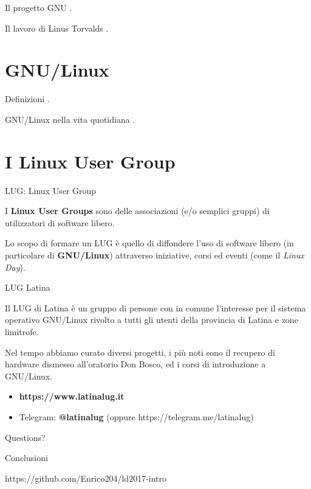 \documentclass[10pt]{beamer}
\begin{document}
\begin{frame}[fragile]{Il progetto GNU}
.
\end{frame}

\begin{frame}[fragile]{Il lavoro di Linus Torvalds}
.
\end{frame}

\section{GNU/Linux}

\begin{frame}[fragile]{Definizioni}
.
\end{frame}

\begin{frame}[fragile]{GNU/Linux nella vita quotidiana}
.
\end{frame}

\section{I Linux User Group}

\begin{frame}{LUG: Linux User Group}

I \textbf{Linux User Groups} sono delle associazioni (e/o semplici gruppi) di utilizzatori di software libero.

Lo scopo di formare un LUG è quello di diffondere l'uso di software libero (in particolare di \textbf{GNU/Linux}) attraverso iniziative, corsi ed eventi (come il \textit{Linux Day}).

\end{frame}

\begin{frame}[fragile]{LUG Latina}

Il LUG di Latina è un gruppo di persone con in comune l'interesse per il sistema operativo GNU/Linux rivolto a tutti gli utenti della provincia di Latina e zone limitrofe.

Nel tempo abbiamo curato diversi progetti, i più noti sono il recupero di hardware dismesso all'oratorio Don Bosco, ed i corsi di introduzione a GNU/Linux.

\begin{itemize}
\item \textbf{https://www.latinalug.it}
\item Telegram: \textbf{@latinalug} (oppure https://telegram.me/latinalug)
\end{itemize}

\end{frame}

\begin{frame}[standout]
  Questions?
\end{frame}

\begin{frame}{Conclusioni}

  \begin{center}\ccbysa\end{center}
  
  \center https://github.com/Enrico204/ld2017-intro

\end{frame}
\end{document}

